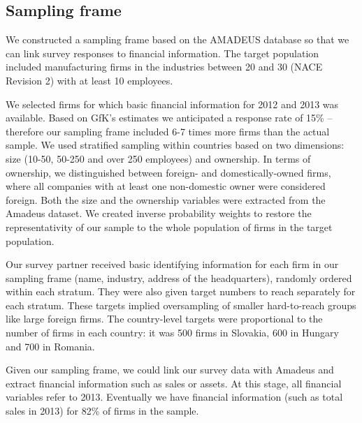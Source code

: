 \usepackage{}\documentclass[final, dvipsnames, authoryear,12pt]{elsarticle}
\begin{document}

\subsection{Sampling frame}

We constructed a sampling frame based on the AMADEUS database \citep{amadeus} so that we can link survey responses to financial information. The target population included manufacturing firms in the industries between 20 and 30 (NACE Revision 2) with at least 10 employees.

We selected firms for which basic financial information for 2012 and 2013 was available. Based on GfK's estimates we anticipated a response rate of 15\% -- therefore our sampling frame included 6-7 times more firms than the actual sample. We used stratified sampling within countries based on two dimensions: size (10-50, 50-250 and over 250 employees) and ownership. In terms of ownership, we distinguished between foreign- and domestically-owned firms, where all companies with at least one non-domestic owner were considered  foreign. Both the size and the ownership variables were extracted from the Amadeus dataset. We created inverse probability weights to restore the representativity of our sample to the whole population of firms in the target population.

Our survey partner received basic identifying information for each firm in our sampling frame (name, industry, address of the headquarters), randomly ordered within each stratum. They were also given target numbers to reach separately for each stratum. These targets implied oversampling of smaller hard-to-reach groups like large foreign firms. The country-level targets were proportional to the number of firms in each country:  it was 500 firms in Slovakia, 600 in Hungary and 700 in Romania.



Given our sampling frame, we could link our survey data with Amadeus and extract financial information such as sales or assets. At this stage, all financial variables refer to 2013. Eventually we have financial information (such as total sales in 2013) for 82\% of firms in the sample. 
\end{document}
